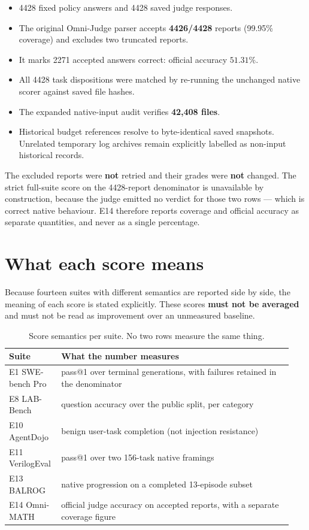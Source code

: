 \begin{itemize}[leftmargin=1.4em,itemsep=2pt]
  \item 4428 fixed policy answers and 4428 saved judge responses.
  \item The original Omni-Judge parser accepts \textbf{4426/4428} reports
  (99.95\% coverage) and excludes two truncated reports.
  \item It marks 2271 accepted answers correct: official accuracy
  $\mathbf{51.31\%}$.
  \item All 4428 task dispositions were matched by re-running the unchanged
  native scorer against saved file hashes.
  \item The expanded native-input audit verifies \textbf{42{,}408 files}.
  \item Historical budget references resolve to byte-identical saved snapshots.
    Unrelated temporary log archives remain explicitly labelled as
    non-input historical records.
\end{itemize}

The excluded reports were \textbf{not} retried and their grades were
\textbf{not} changed. The strict full-suite score on the 4428-report denominator
is unavailable by construction, because the judge emitted no verdict for those two
rows --- which is correct native behaviour. E14 therefore reports coverage and
official accuracy as separate quantities, and never as a single percentage.

\section{What each score means}

Because fourteen suites with different semantics are reported side by side, the
meaning of each score is stated explicitly. These scores \textbf{must not be
averaged} and must not be read as improvement over an unmeasured baseline.

\begin{table}[h]
  \centering
  \caption{Score semantics per suite. No two rows measure the same thing.}
  \label{tab:semantics}
  \small
  \begin{tabular}{@{}L{0.16\linewidth}L{0.78\linewidth}@{}}
    \toprule
    \textbf{Suite} & \textbf{What the number measures} \\
    \midrule
    E1 SWE-bench Pro & pass@1 over terminal generations, with failures retained in the denominator \\
    E8 LAB-Bench & question accuracy over the public split, per category \\
    E10 AgentDojo & benign user-task completion (not injection resistance) \\
    E11 VerilogEval & pass@1 over two 156-task native framings \\
    E13 BALROG & native progression on a completed 13-episode subset \\
    E14 Omni-MATH & official judge accuracy on accepted reports, with a separate coverage figure \\
    \bottomrule
  \end{tabular}
\end{table}

